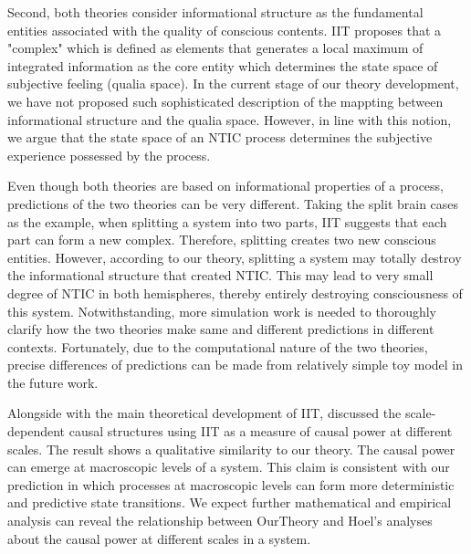 \documentclass[utf8]{article}
\begin{document}
		Second, both theories consider informational structure as the fundamental entities associated with the quality of conscious contents. IIT proposes that a "complex" which is defined as elements that generates a local maximum of integrated information as the core entity which determines the state space of subjective feeling (qualia space). In the current stage of our theory development, we have not proposed such sophisticated description of the mappting between informational structure and the qualia space. However, in line with this notion, we argue that the state space of an NTIC process determines the subjective experience possessed by the process. 
		
		
		

		Even though both theories are based on informational properties of a process, predictions of the two theories can be very different. Taking the split brain cases as the example, when splitting a system into two parts, IIT suggests that each part can form a new complex. Therefore, splitting creates two new conscious entities. However, according to our theory, splitting a system may totally destroy the informational structure that created NTIC. This may lead to very small degree of NTIC in both hemispheres, thereby entirely destroying consciousness of this system. Notwithstanding, more simulation work is needed to thoroughly clarify how the two theories make same and different predictions in different contexts. Fortunately, due to the computational nature of the two theories, precise differences of predictions can be made from relatively simple toy model in the future work. 
		
		Alongside with the main theoretical development of IIT, \cite{hoel2016can,hoel2013quantifying} discussed the scale-dependent causal structures using IIT as a measure of causal power at different scales. The result shows a qualitative similarity to our theory. The causal power can emerge at macroscopic levels of a system. This claim is consistent with our prediction in which processes at macroscopic levels can form more deterministic and predictive state transitions. We expect further mathematical and empirical analysis can reveal the relationship between \ac{OurTheory} and Hoel's analyses about the causal power at different scales in a system.  
		
\end{document}
